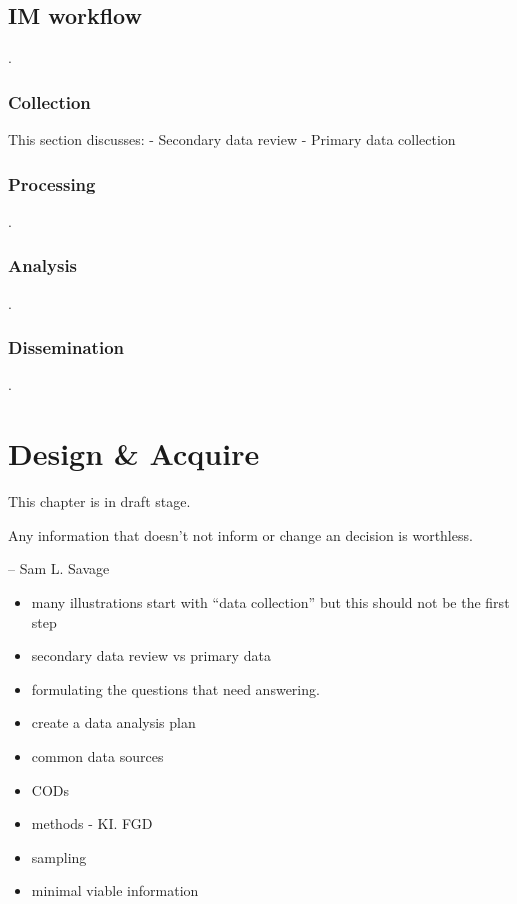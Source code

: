 \documentclass[
  a4paper,
  onecolumn,
  oneside]{book}
\providecommand{\tightlist}{%
  \setlength{\itemsep}{0pt}\setlength{\parskip}{0pt}}\usepackage{longtable,booktabs,array}
\begin{document}
\hypertarget{im-workflow}{%
\section{IM workflow}\label{im-workflow}}

.

\hypertarget{collection}{%
\subsection{Collection}\label{collection}}

This section discusses: - Secondary data review - Primary data
collection

\hypertarget{processing}{%
\subsection{Processing}\label{processing}}

.

\hypertarget{analysis}{%
\subsection{Analysis}\label{analysis}}

.

\hypertarget{dissemination}{%
\subsection{Dissemination}\label{dissemination}}

.

\hypertarget{design-acquire}{%
\chapter{Design \& Acquire}\label{design-acquire}}

This chapter is in draft stage.

Any information that doesn't not inform or change an decision is
worthless.

-- Sam L. Savage

\begin{itemize}
\tightlist
\item
  many illustrations start with ``data collection'' but this should not
  be the first step
\item
  secondary data review vs primary data
\item
  formulating the questions that need answering.
\item
  create a data analysis plan
\item
  common data sources
\item
  CODs
\item
  methods - KI. FGD
\item
  sampling
\item
  minimal viable information
\end{itemize}
\end{document}
